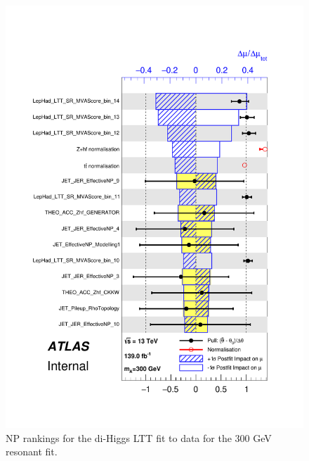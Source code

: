 \begin{figure}
\centering
\includegraphics[width=.8\textwidth]{figures/results/HH/LepHad/pulls_SigXsecOverSM_300_LTT.pdf}
\caption{NP rankings for the di-Higgs \lephad LTT fit to data for the 300 GeV resonant fit.}
\label{fig:LepHadPostfitNPRankings2HDM300LTT}
\end{figure}

